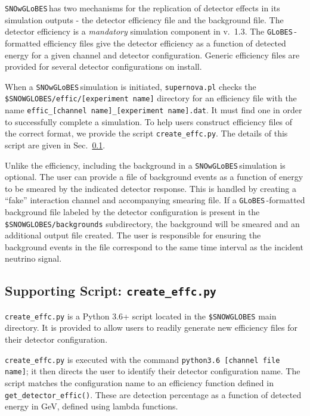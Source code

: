 \documentclass{article}
\newcommand{\snow}{\texttt{SNOwGLoBES}\,}
\newcommand{\glb}{\texttt{GLoBES}\,}
\begin{document}
\snow has two mechanisms for the replication of detector effects in its simulation outputs - the detector efficiency file and the background file. The detector efficiency is a \textit{mandatory} simulation component in v.~1.3. The \glb-formatted efficiency files give the detector efficiency as a function of detected energy for a given channel and detector configuration. Generic efficiency files are provided for several detector configurations on install.

When a \snow simulation is initiated, \texttt{supernova.pl} checks the \texttt{\$SNOWGLOBES/effic/[experiment name]} directory for an efficiency file with the name \texttt{effic\_[channel name]\_[experiment name].dat}. It must find one in order to successfully complete a simulation. To help users construct efficiency files of the correct format, we provide the script \texttt{create\_effc.py}. The details of this script are given in Sec.~\ref{subsec:efficsupportscript}.

Unlike the efficiency, including the background in a \snow simulation is optional. The user can provide a file of background events as a function of energy to be smeared by the indicated detector response. This is handled by creating a ``fake'' interaction channel and accompanying smearing file. If a \glb-formatted background file labeled by the detector configuration is present in the \texttt{\$SNOWGLOBES/backgrounds} subdirectory, the background will be smeared and an additional output file created.  The user is responsible for ensuring the background events in the file correspond to the same time interval as the incident neutrino signal.

\subsection{Supporting Script: \texttt{create\_effc.py}} \label{subsec:efficsupportscript}

\texttt{create\_effc.py} is a Python 3.6+ script located in the \texttt{\$SNOWGLOBES} main directory.  It is provided to allow users to readily generate new efficiency files for their detector configuration.

\texttt{create\_effc.py} is executed with the command \texttt{python3.6 [channel file name]}; it then directs the user to identify their detector configuration name. The script matches the configuration name to an efficiency function defined in \texttt{get\_detector\_effic()}. These are detection percentage as a function of detected energy in GeV, defined using lambda functions. 
\end{document}
